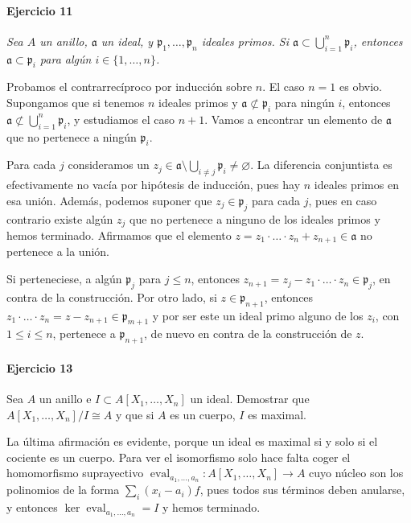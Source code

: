 \documentclass[../main.tex]{subfiles}
\begin{document}
\paragraph{Ejercicio 11} \textit{Sea $A$ un anillo, $\mathfrak a$ un ideal, y $\mathfrak p_1, \ldots, \mathfrak p_n$ ideales primos. Si $\mathfrak a \subset \bigcup_{i=1}^n \mathfrak p_i$, entonces $\mathfrak a \subset \mathfrak p_i$ para algún $i\in \{1, \ldots, n\}$.}

Probamos el contrarrecíproco por inducción sobre $n$. El caso $n=1$ es obvio. Supongamos que si tenemos $n$ ideales primos y $\mathfrak a \not \subset \mathfrak p_i$ para ningún $i$, entonces $\mathfrak a \not \subset \bigcup_{i=1}^n \mathfrak p_i$, y estudiamos el caso $n+1$.  Vamos a encontrar un elemento de $\mathfrak a$ que no pertenece a ningún $\mathfrak p_i$.

Para cada $j$ consideramos un $z_j \in \mathfrak a \setminus \bigcup_{i\neq j} \mathfrak p_i \neq \varnothing$. La diferencia conjuntista es efectivamente no vacía por hipótesis de inducción, pues hay $n$ ideales primos en esa unión. Además, podemos suponer que $z_j \in \mathfrak p_j$ para cada $j$, pues en caso contrario existe algún $z_j$ que no pertenece a ninguno de los ideales primos y hemos terminado. Afirmamos que el elemento $z= z_1\cdot\ldots\cdot z_n + z_{n+1}\in \mathfrak a$ no pertenece a la unión.

Si perteneciese, a algún $\mathfrak p_j$ para $j\leq n$, entonces $z_{n+1} = z_j -z_1\cdot\ldots\cdot z_n  \in \mathfrak p_j $, en contra de la construcción. Por otro lado, si $z\in \mathfrak p_{n+1}$, entonces $z_1\cdot\ldots\cdot z_n = z-z_{n+1} \in \mathfrak p_{m+1}$ y por ser este un ideal primo alguno de los $z_i$, con $1 \leq i \leq n$, pertenece a $\mathfrak p_{n+1}$, de nuevo en contra de la construcción de $z$.

\paragraph{Ejercicio 13} Sea $A$ un anillo e $I\subset A[X_1,\ldots, X_n]$ un ideal. Demostrar que $A[X_1,\ldots, X_n]/I \cong A$ y que si $A$ es un cuerpo, $I$ es maximal.

La última afirmación es evidente, porque un ideal es maximal si y solo si el cociente es un cuerpo.  Para ver el isomorfismo solo hace falta coger el homomorfismo suprayectivo $\operatorname{eval}_{a_1,\ldots, a_n}:A[X_1,\ldots,X_n]\to A$ cuyo núcleo son los polinomios de la forma $\sum_i (x_i-a_i)f$, pues todos sus términos deben anularse, y entonces $\ker \operatorname{eval}_{a_1,\ldots, a_n} = I$ y hemos terminado.
\end{document}
